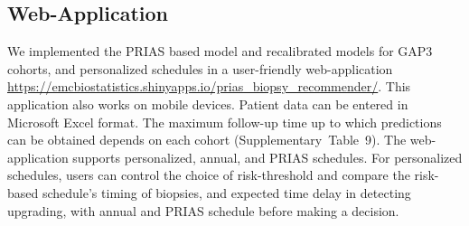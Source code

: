 \subsection{Web-Application}
We implemented the PRIAS based model and recalibrated models for GAP3 cohorts, and personalized schedules in a user-friendly web-application \url{https://emcbiostatistics.shinyapps.io/prias_biopsy_recommender/}. This application also works on mobile devices. Patient data can be entered in Microsoft Excel format. The maximum follow-up time up to which predictions can be obtained depends on each cohort (Supplementary~Table~9). The web-application supports personalized, annual, and PRIAS schedules. For personalized schedules, users can control the choice of risk-threshold and compare the risk-based schedule's timing of biopsies, and expected time delay in detecting upgrading, with annual and PRIAS schedule before making a decision.